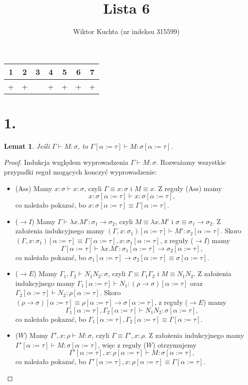 \documentclass[a4paper, 12pt]{article}
\title{Lista 6}
\author{Wiktor Kuchta (nr indeksu 315599)}
\newtheorem*{lemat}{Lemat}
\newcommand{\+}{\enspace}
\begin{document}
\maketitle

\begin{center}
	\begin{tabular}{ |*{7}{c|} }
	\hline
	1 & 2 & 3 & 4 & 5 & 6 & 7 \\
	\hline
	+ & + &   & + & + & + & + \\
	\hline
\end{tabular}
\end{center}

\section*{1.}

\begin{lemat}
Jeśli $Γ ⊢ M : σ $, to $Γ[α:=τ] ⊢ M : σ[α:=τ]$.
\end{lemat}
\begin{proof}
Indukcja względem wyprowadzenia $Γ ⊢ M : σ$.
Rozważamy wszystkie przypadki reguł mogących konczyć wyprowadzenie:
\begin{itemize}
	\item (Ass)
		Mamy $x : σ ⊢ x : σ$, czyli $Γ ≡ x : σ$ i $M ≡ x$.
		Z reguły (Ass) mamy
		$$x : σ[α:=τ] ⊢ x : σ[α:=τ],$$
		co należało pokazać, bo $x : σ[α:=τ] ≡ Γ[α:=τ]$.
	\item ($→I$)
		Mamy $Γ ⊢ λx.M' : σ_1 → σ_2$, czyli $M≡λx.M'$ i $σ ≡ σ_1→σ_2$.
		Z założenia indukcyjnego mamy $(Γ, x:σ_1)[α:=τ] ⊢ M' : σ_2[α:=τ]$.
		Skoro $(Γ, x:σ_1)[α:=τ] ≡ Γ[α:=τ], x:σ_1[α:=τ]$, z reguły ($→I$) mamy
		$$Γ[α:=τ] ⊢ λx.M' : σ_1[α:=τ] → σ_2[α:=τ],$$
		co należało pokazać, bo $σ_1[α:=τ] → σ_2[α:=τ] ≡ σ[α:=τ]$.
	\item ($→E$)
		Mamy $Γ_1, Γ_2 ⊢ N_1 N_2 : σ$, czyli $Γ ≡ Γ_1 Γ_2$ i $M ≡ N_1 N_2$.
		Z założenia indukcyjnego mamy
		$Γ_1[α:=τ] ⊢ N_1 : (ρ → σ)[α:=τ]$ oraz $Γ_2[α:=τ] ⊢ N_2 : ρ[α:=τ]$.
		Skoro $(ρ → σ)[α:=τ] ≡ ρ[α:=τ] → σ[α:=τ]$,
		z reguły ($→E$) mamy
		$$Γ_1[α:=τ],Γ_2[α:=τ] ⊢ N_1 N_2 : σ[α:=τ],$$
		co należało pokazać, bo $Γ_1[α:=τ],Γ_2[α:=τ] ≡ Γ[α:=τ]$.
	\item ($W$)
		Mamy $Γ', x:ρ ⊢ M : σ$, czyli $Γ ≡ Γ', x:ρ$.
		Z założenia indukcyjnego mamy
		$Γ'[α:=τ] ⊢ M : σ[α:=τ]$, więc z reguły ($W$) otrzymujemy
		$$Γ'[α:=τ], x:ρ[α:=τ] ⊢ M : σ[α:=τ],$$
		co należało pokazać, bo $Γ'[α:=τ], x:ρ[α:=τ] ≡ Γ[α:=τ]$.
\end{itemize}

\end{proof}
\end{document}
